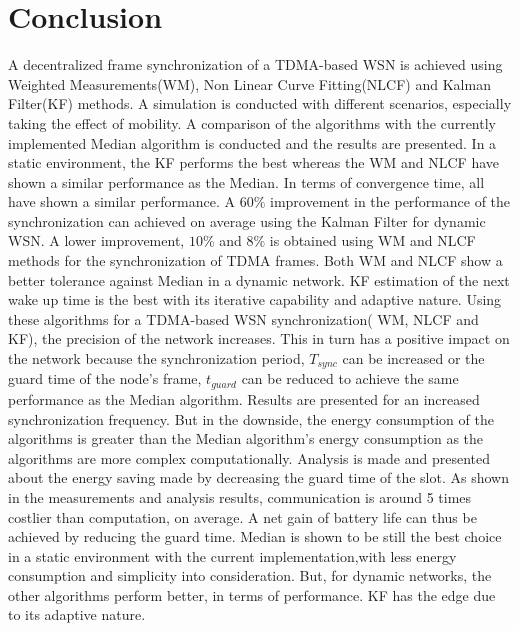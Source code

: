 \documentclass[a4paper,10pt]{report}
\begin{document}
\section{Conclusion}\noindent
A decentralized frame synchronization of a TDMA-based WSN is achieved
using Weighted Measurements(WM), Non Linear Curve Fitting(NLCF) and
Kalman Filter(KF) methods. A simulation is conducted with different scenarios, especially
taking the effect of mobility. A comparison of the algorithms with the currently implemented Median algorithm
is conducted and the results are presented.
\newline
In a static environment, the KF performs the best whereas the WM and NLCF have shown a similar performance as the
Median. In terms of convergence time, all have shown a similar performance.
\newline
A $60\%$ improvement in the performance of the synchronization can
achieved on average using the Kalman Filter for dynamic WSN. A lower
improvement, $10\%$ and $8\%$ is obtained using WM and NLCF methods
for the synchronization of TDMA frames. Both WM and NLCF show a better tolerance
against Median in a dynamic network. KF estimation of
the next wake up time is the best with its iterative capability and
adaptive nature.
\newline
Using these algorithms for a TDMA-based WSN synchronization( WM, NLCF and KF), the precision of the network increases.
This in turn has a positive impact on the network because the synchronization period,
$T_{sync}$ can be increased or the guard time of the node's frame,
$t_{guard}$ can be reduced to achieve the same performance as the
Median algorithm. Results are presented for an increased synchronization frequency.
\newline
But in the downside, the energy consumption of the algorithms is
greater than the Median algorithm's energy consumption as the algorithms are more complex computationally. Analysis is made and presented about the
energy saving made by decreasing the guard time of the slot. As shown in the measurements and analysis results,
communication is around 5 times costlier than computation, on average. A net gain of battery life can thus be achieved by reducing the guard time.
\newline
Median is shown to be still the best choice in a static environment with the current implementation,with less energy consumption and simplicity into consideration. But, for dynamic networks, the other algorithms perform better, in terms of
performance. KF has the edge due to its adaptive nature.
\end{document}

